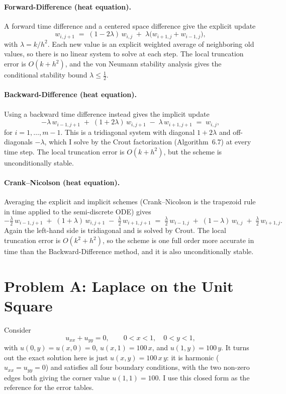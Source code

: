 \documentclass[11pt]{article}
\begin{document}
\paragraph{Forward-Difference (heat equation).}
A forward time difference and a centered space difference give the explicit
update
\[
w_{i,j+1} \;=\; (1 - 2\lambda)\,w_{i,j}
\;+\; \lambda\bigl(w_{i+1,j} + w_{i-1,j}\bigr),
\]
with $\lambda = k/h^{2}$. Each new value is an explicit weighted average of
neighboring old values, so there is no linear system to solve at each step.
The local truncation error is $O(k + h^{2})$, and the von Neumann stability
analysis gives the conditional stability bound $\lambda \le \tfrac12$.

\paragraph{Backward-Difference (heat equation).}
Using a backward time difference instead gives the implicit update
\[
-\lambda\,w_{i-1,j+1} \;+\; (1 + 2\lambda)\,w_{i,j+1}
\;-\; \lambda\,w_{i+1,j+1}
\;=\; w_{i,j},
\]
for $i = 1,\dots,m-1$. This is a tridiagonal system with diagonal
$1+2\lambda$ and off-diagonals $-\lambda$, which I solve by the Crout
factorization (Algorithm~6.7) at every time step. The local truncation error
is $O(k + h^{2})$, but the scheme is unconditionally stable.

\paragraph{Crank--Nicolson (heat equation).}
Averaging the explicit and implicit schemes (Crank--Nicolson is the trapezoid
rule in time applied to the semi-discrete ODE) gives
\[
-\tfrac{\lambda}{2}\,w_{i-1,j+1} \;+\; (1+\lambda)\,w_{i,j+1}
\;-\; \tfrac{\lambda}{2}\,w_{i+1,j+1}
\;=\;
\tfrac{\lambda}{2}\,w_{i-1,j} \;+\; (1-\lambda)\,w_{i,j}
\;+\; \tfrac{\lambda}{2}\,w_{i+1,j}.
\]
Again the left-hand side is tridiagonal and is solved by Crout. The local
truncation error is $O(k^{2} + h^{2})$, so the scheme is one full order more
accurate in time than the Backward-Difference method, and it is also
unconditionally stable.

\section{Problem A: Laplace on the Unit Square}
Consider
\[
u_{xx} + u_{yy} = 0, \qquad 0 < x < 1, \quad 0 < y < 1,
\]
with $u(0,y) = u(x,0) = 0$, $u(x,1) = 100\,x$, and $u(1,y) = 100\,y$. It
turns out the exact solution here is just $u(x,y) = 100\,x\,y$: it is harmonic
($u_{xx} = u_{yy} = 0$) and satisfies all four boundary conditions, with the
two non-zero edges both giving the corner value $u(1,1) = 100$. I use this
closed form as the reference for the error tables.
\end{document}
